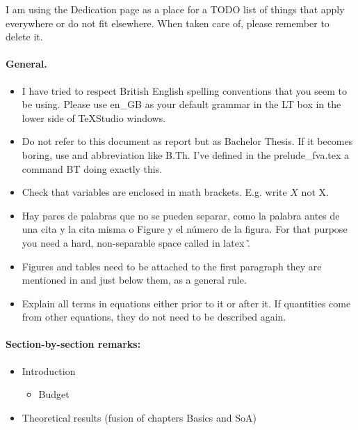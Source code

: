 {\color{red} %
I am using the Dedication page as a place for a TODO list of things that apply everywhere or do not fit elsewhere. When taken care of, please remember to delete it. 

\paragraph{General. }

\begin{itemize}

\item I have tried to  respect British English spelling conventions that you seem to be using. Please use en\_GB as your default grammar in the LT box in the lower side of TeXStudio windows. 

\item Do not refer to this document as report but as Bachelor Thesis. If it becomes boring, use and abbreviation like B.Th. I've defined in  the prelude\_fva.tex a command {}BT doing exactly this.

\item Check that variables are enclosed in math brackets. E.g. write $X$ not X.

\item Hay pares de palabras que no se pueden separar, como la palabra antes de una cita y la cita misma o Figure y el n\'umero de la figura. For that purpose you need a hard, non-separable space called in latex \~.

\item Figures and tables need to be attached to the first paragraph they are mentioned in and just below them, as a general rule. 

\item Explain all terms in equations either prior to it or after it. If quantities come from other equations, they do not need to be described again. 

\end{itemize}

\paragraph{Section-by-section remarks: }
\begin{itemize}
\item Introduction

\begin{itemize}
\item Budget

\end{itemize} 

\item Theoretical results (fusion of chapters Basics and SoA)



\end{itemize}
} %
